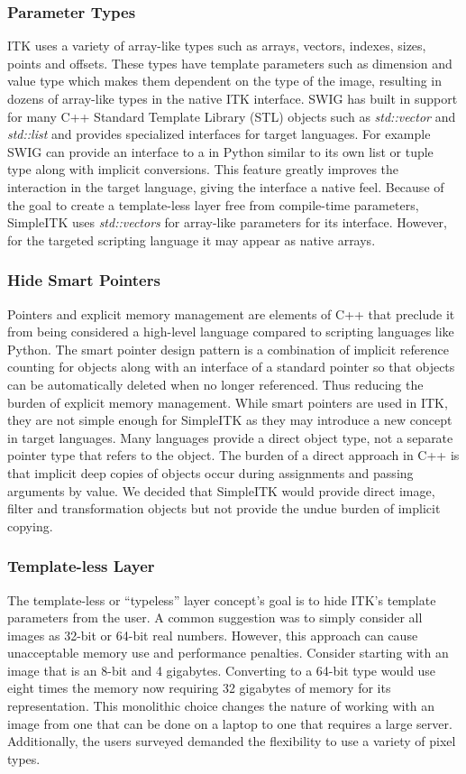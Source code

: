 \documentclass{frontiersMED} %
\begin{document}
\subsubsection{Parameter Types}
ITK uses a variety of array-like types such as arrays, vectors,
indexes, sizes, points and offsets. These types have template
parameters such as dimension and value type which makes them dependent
on the type of the image, resulting in dozens of array-like types in
the native ITK interface. SWIG has built in support for many C++
Standard Template Library (STL) objects such as \textit{std::vector} and
\textit{std::list} and provides specialized interfaces for target
languages. For example SWIG can provide an interface to a 
in Python similar to its own list or tuple type along with implicit
conversions. This feature greatly improves the interaction in the
target language, giving the interface a native feel. Because of the
goal to create a template-less layer free from compile-time
parameters, SimpleITK uses \textit{std::vectors} for array-like parameters for
its interface. However, for the targeted scripting language it may
appear as native arrays.

\subsubsection{Hide Smart Pointers}
Pointers and explicit memory management are elements of C++ that
preclude it from being considered a high-level language compared to
scripting languages like Python. The smart pointer design pattern is a
combination of implicit reference counting for objects along with an
interface of a standard pointer so that objects can be automatically
deleted when no longer referenced. Thus reducing the burden of explicit
memory management. While smart pointers are used in ITK, they are not
simple enough for SimpleITK as they may introduce a new concept in
target languages. Many languages provide a direct object type, not a
separate pointer type that refers to the object. The burden of a
direct approach in C++ is that implicit deep copies of objects occur
during assignments and passing arguments by value. We decided that
SimpleITK would provide direct image, filter and transformation
objects but not provide the undue burden of implicit copying.

\subsubsection{Template-less Layer}
The template-less or “typeless” layer concept's goal is to hide ITK's
template parameters from the user. A common suggestion was to simply
consider all images as 32-bit or 64-bit real numbers. However, this
approach can cause unacceptable memory use and performance
penalties. Consider starting with an image that is an 8-bit and 4
gigabytes.  Converting to a 64-bit type would use eight times the
memory now requiring 32 gigabytes of memory for its
representation. This monolithic choice changes the nature of working
with an image from one that can be done on a laptop to one that
requires a large server. Additionally, the users surveyed demanded the
flexibility to use a variety of pixel types.
\end{document}
